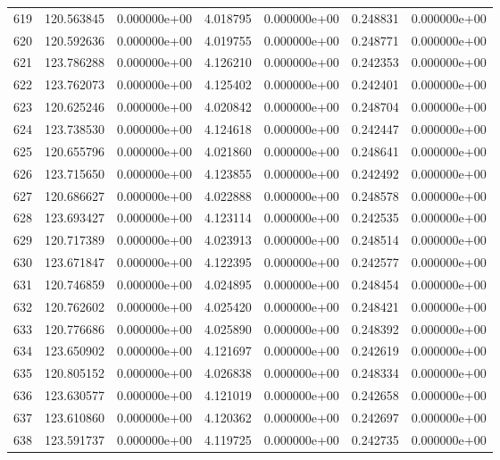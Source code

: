 \begin{tabular}{rrrrrrr}
 619 & 120.563845 &  0.000000e+00 &  4.018795 &  0.000000e+00 &   0.248831 &  0.000000e+00 \\
 620 & 120.592636 &  0.000000e+00 &  4.019755 &  0.000000e+00 &   0.248771 &  0.000000e+00 \\
 621 & 123.786288 &  0.000000e+00 &  4.126210 &  0.000000e+00 &   0.242353 &  0.000000e+00 \\
 622 & 123.762073 &  0.000000e+00 &  4.125402 &  0.000000e+00 &   0.242401 &  0.000000e+00 \\
 623 & 120.625246 &  0.000000e+00 &  4.020842 &  0.000000e+00 &   0.248704 &  0.000000e+00 \\
 624 & 123.738530 &  0.000000e+00 &  4.124618 &  0.000000e+00 &   0.242447 &  0.000000e+00 \\
 625 & 120.655796 &  0.000000e+00 &  4.021860 &  0.000000e+00 &   0.248641 &  0.000000e+00 \\
 626 & 123.715650 &  0.000000e+00 &  4.123855 &  0.000000e+00 &   0.242492 &  0.000000e+00 \\
 627 & 120.686627 &  0.000000e+00 &  4.022888 &  0.000000e+00 &   0.248578 &  0.000000e+00 \\
 628 & 123.693427 &  0.000000e+00 &  4.123114 &  0.000000e+00 &   0.242535 &  0.000000e+00 \\
 629 & 120.717389 &  0.000000e+00 &  4.023913 &  0.000000e+00 &   0.248514 &  0.000000e+00 \\
 630 & 123.671847 &  0.000000e+00 &  4.122395 &  0.000000e+00 &   0.242577 &  0.000000e+00 \\
 631 & 120.746859 &  0.000000e+00 &  4.024895 &  0.000000e+00 &   0.248454 &  0.000000e+00 \\
 632 & 120.762602 &  0.000000e+00 &  4.025420 &  0.000000e+00 &   0.248421 &  0.000000e+00 \\
 633 & 120.776686 &  0.000000e+00 &  4.025890 &  0.000000e+00 &   0.248392 &  0.000000e+00 \\
 634 & 123.650902 &  0.000000e+00 &  4.121697 &  0.000000e+00 &   0.242619 &  0.000000e+00 \\
 635 & 120.805152 &  0.000000e+00 &  4.026838 &  0.000000e+00 &   0.248334 &  0.000000e+00 \\
 636 & 123.630577 &  0.000000e+00 &  4.121019 &  0.000000e+00 &   0.242658 &  0.000000e+00 \\
 637 & 123.610860 &  0.000000e+00 &  4.120362 &  0.000000e+00 &   0.242697 &  0.000000e+00 \\
 638 & 123.591737 &  0.000000e+00 &  4.119725 &  0.000000e+00 &   0.242735 &  0.000000e+00 \\

\end{tabular}
